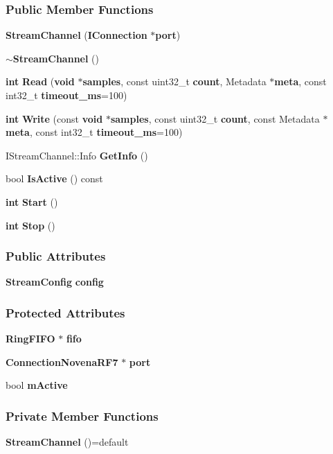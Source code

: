 \subsubsection*{Public Member Functions}
\begin{DoxyCompactItemize}
\item 
{\bf Stream\+Channel} ({\bf I\+Connection} $\ast${\bf port})
\item 
{\bf $\sim$\+Stream\+Channel} ()
\item 
{\bf int} {\bf Read} ({\bf void} $\ast${\bf samples}, const uint32\+\_\+t {\bf count}, Metadata $\ast${\bf meta}, const int32\+\_\+t {\bf timeout\+\_\+ms}=100)
\item 
{\bf int} {\bf Write} (const {\bf void} $\ast${\bf samples}, const uint32\+\_\+t {\bf count}, const Metadata $\ast${\bf meta}, const int32\+\_\+t {\bf timeout\+\_\+ms}=100)
\item 
I\+Stream\+Channel\+::\+Info {\bf Get\+Info} ()
\item 
bool {\bf Is\+Active} () const 
\item 
{\bf int} {\bf Start} ()
\item 
{\bf int} {\bf Stop} ()
\end{DoxyCompactItemize}
\subsubsection*{Public Attributes}
\begin{DoxyCompactItemize}
\item 
{\bf Stream\+Config} {\bf config}
\end{DoxyCompactItemize}
\subsubsection*{Protected Attributes}
\begin{DoxyCompactItemize}
\item 
{\bf Ring\+F\+I\+FO} $\ast$ {\bf fifo}
\item 
{\bf Connection\+Novena\+R\+F7} $\ast$ {\bf port}
\item 
bool {\bf m\+Active}
\end{DoxyCompactItemize}
\subsubsection*{Private Member Functions}
\begin{DoxyCompactItemize}
\item 
{\bf Stream\+Channel} ()=default
\end{DoxyCompactItemize}


